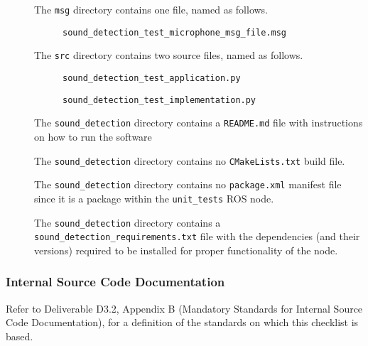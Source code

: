 \documentclass{CSSRforAfrica}
\newcommand{\checkboxChecked}{\fbox{\ding{51}}} %
\newcommand{\checkboxDashed}{\fbox{--}}         %
\begin{document}
\begin{description}
\item[\checkboxChecked] The  {\small \verb+msg+} directory contains one file, named as follows.
\begin{description}
\item[\checkboxChecked] {\small \verb+sound_detection_test_microphone_msg_file.msg+}  
\end{description} 

\item[\checkboxChecked] The  {\small \verb+src+} directory contains two source files, named as follows.
\begin{description}
\item[\checkboxChecked] {\small \verb+sound_detection_test_application.py+}  
\item[\checkboxChecked]  {\small \verb+sound_detection_test_implementation.py+}  
\end{description} 

\item[\checkboxChecked] The {\small \verb+sound_detection+} directory contains  a {\small \verb+README.md+} file with  instructions on how to run the software 
\item[\checkboxChecked] The {\small \verb+sound_detection+} directory contains  no {\small \verb+CMakeLists.txt+} build file.
\item[\checkboxChecked] The {\small \verb+sound_detection+} directory contains  no {\small \verb+package.xml+} manifest file since it is a package within the {\small \verb+unit_tests+} ROS node.
\item[\checkboxDashed] The {\small \verb+sound_detection+} directory contains  a {\small \verb+sound_detection_requirements.txt+} file with the dependencies (and their versions) required to be installed for proper functionality of the node.

\end{description}


 
 \newpage
\subsubsection{Internal Source Code Documentation}
\label{subsubsection:sound_detection_test_documentation_standards}  
 
Refer to Deliverable D3.2, Appendix B (Mandatory Standards for Internal Source Code Documentation), for a definition of the standards on which this checklist is based.\\
\end{document}
